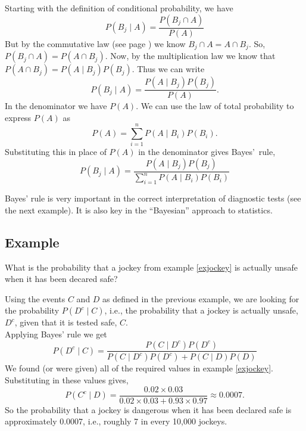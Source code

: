 \noindent Starting with the definition of conditional probability, we have
\[
P(B_j \! \mid \! A)  = \frac{P(B_j \cap A)}{P(A)}
\]
But by the commutative law (see page \pageref{commutative law}) we know $B_j \cap A = A \cap B_j$. So, $P(B_j \cap A) = P(A \cap B_j)$. Now, by the multiplication law we know that $P(A \cap B_j) = P(A \! \mid \! B_j)P(B_j)$. Thus we can write
\[
P(B_j \! \mid \! A) = \frac{P(A \! \mid \! B_j)P(B_j)}{P(A)}.
\]
In the denominator we have $P(A)$. We can use the law of total probability to express $P(A)$ as
\[
P(A) = \sum_{i = 1}^nP(A \! \mid \! B_i)P(B_i).
\]
Substituting this in place of $P(A)$ in the denominator gives Bayes'~rule,
\[
P(B_j \! \mid \! A) = \frac{P(A \! \mid \! B_j)P(B_j)}{\displaystyle{\sum_{i = 1}^nP(A \! \mid \! B_i)P(B_i)}}
\]
\bigskip
\hfil{}
\bigskip

\noindent Bayes' rule is very important in the correct interpretation of diagnostic tests (see the next example). It is also key in the ``Bayesian'' approach to statistics.


\subsection{Example}
What is the probability that a jockey from example \ref{exjockey} is actually unsafe when it has been decared safe?

\noindent Using the events $C$ and $D$ as defined in the previous example, we are looking for the probability $P(D^c \! \mid \! C)$, i.e., the probability that a jockey is actually unsafe, $D^c$, given that it is tested safe, $C.$ \\

\noindent Applying Bayes' rule we get
\[
P(D^c \! \mid \! C) = \frac{P(C \! \mid \! D^c)P(D^c)}{P(C \! \mid \! D^c)P(D^c) + P(C \! \mid \! D)P(D)}
\]
We found (or were given) all of the required values in example \ref{exjockey}. Substituting in these values gives,
\[
P(C^c \! \mid \! D) = \frac{0.02\times0.03}{0.02\times 0.03 + 0.93 \times 0.97} \approx 0.0007.
\]
So the probability that a jockey is dangerous when it has been declared safe is approximately 0.0007, i.e., roughly 7 in every 10,000 jockeys.
